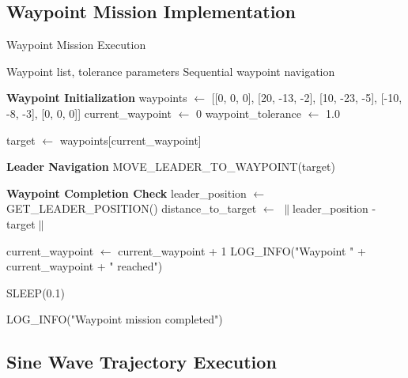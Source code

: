 \documentclass[11pt,a4paper]{article}
\begin{document}
\subsection{Waypoint Mission Implementation}

\begin{algorithm}[H]
\caption{Waypoint Mission Execution}
\label{alg:waypoint_mission}
\begin{algorithmic}[1]
\Require Waypoint list, tolerance parameters
\Ensure Sequential waypoint navigation

\State \textbf{Waypoint Initialization}
\State waypoints $\leftarrow$ [[0, 0, 0], [20, -13, -2], [10, -23, -5], [-10, -8, -3], [0, 0, 0]]
\State current\_waypoint $\leftarrow$ 0
\State waypoint\_tolerance $\leftarrow$ 1.0 

    \State target $\leftarrow$ waypoints[current\_waypoint]
    
    \State \textbf{Leader Navigation}
    \State MOVE\_LEADER\_TO\_WAYPOINT(target)
    
    \State \textbf{Waypoint Completion Check}
    \State leader\_position $\leftarrow$ GET\_LEADER\_POSITION()
    \State distance\_to\_target $\leftarrow$ $\|$leader\_position - target$\|$
    
        \State current\_waypoint $\leftarrow$ current\_waypoint + 1
        \State LOG\_INFO("Waypoint " + current\_waypoint + " reached")
    \EndIf
    
    \State SLEEP(0.1)
\EndWhile

\State LOG\_INFO("Waypoint mission completed")
\end{algorithmic}
\end{algorithm}

\subsection{Sine Wave Trajectory Execution}
\end{document}
